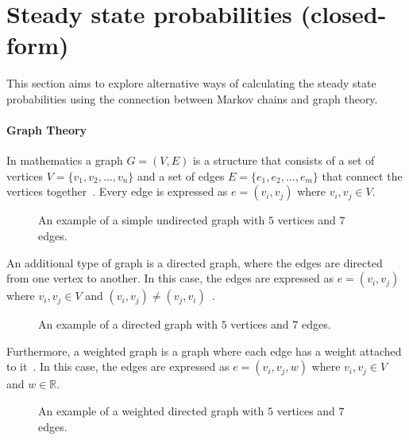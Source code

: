 \chapter{Steady state probabilities (closed-form)}
\label{app:steady_state_probs_closed_form}

This section aims to explore alternative ways of calculating the steady state
probabilities using the connection between Markov chains and graph
theory.

\subsubsection{Graph Theory}
In mathematics a graph \(G = (V, E)\) is a structure that consists of a set of
vertices \(V = \{v_1, v_2, \dots, v_n\}\) and a set of edges \(E = \{e_1, e_2,
\dots, e_m\}\) that connect the vertices together~\cite{bender2010lists}.
Every edge is expressed as \(e = (v_i, v_j)\) where \(v_i, v_j \in V\).

\begin{figure}[H]
    \centering
    
    \caption{An example of a simple undirected graph with \(5\) vertices and
    \(7\) edges.}
    \label{fig:example_of_graph}
\end{figure}

An additional type of graph is a directed graph, where the edges are directed
from one vertex to another.
In this case, the edges are expressed as \(e = (v_i, v_j)\) where \(v_i, v_j
\in V\) and \((v_i, v_j) \neq (v_j, v_i)\)~\cite{balakrishnan2012textbook}.

\begin{figure}[H]
    \centering
    
    \caption{An example of a directed graph with \(5\) vertices and \(7\)
    edges.}
    \label{fig:example_of_directed_graph}
\end{figure}

Furthermore, a weighted graph is a graph where each edge has a weight attached
to it~\cite{krukowski2021approximate}.
In this case, the edges are expressed as \(e = (v_i, v_j, w)\) where \(v_i, v_j
\in V\) and \(w \in \mathbb{R}\).

\begin{figure}[H]
    \centering
    
    \caption{An example of a weighted directed graph with \(5\) vertices and
    \(7\) edges.}
    \label{fig:example_of_weighted_directed_graph}
\end{figure}

